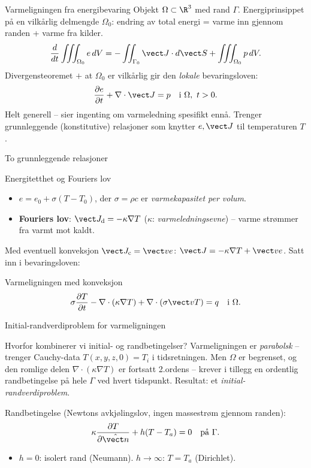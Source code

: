\documentclass[11pt,aspectratio=169]{beamer}
\begin{document}
\begin{frame}{Varmeligningen fra energibevaring}
Objekt $\Omega\subset\R^3$ med rand $\Gamma$. Energiprinsippet på en vilkårlig delmengde $\Omega_0$: endring av total energi = varme inn gjennom randen + varme fra kilder.
\[
\frac{d}{dt}\iiint_{\Omega_0} e\,dV = -\iint_{\Gamma_0}\vect J\cdot d\vect S + \iiint_{\Omega_0} p\,dV.
\]
Divergensteoremet $+$ at $\Omega_0$ er vilkårlig gir den \emph{lokale} bevaringsloven:
\begin{equation}
\frac{\partial e}{\partial t} + \nabla\cdot\vect J = p \quad \text{i } \Omega,\ t>0.
\end{equation}
Helt generell -- sier ingenting om varmeledning spesifikt ennå. Trenger grunnleggende (konstitutive) relasjoner som knytter $e,\vect J$ til temperaturen $T$.
\end{frame}

\begin{frame}{To grunnleggende relasjoner}
\begin{defnb}{Energitetthet og Fouriers lov}
\begin{itemize}
\item $e = e_0+\sigma(T-T_0)$, der $\sigma=\rho c$ er \emph{varmekapasitet per volum}.
\item \textbf{Fouriers lov}: $\vect J_{\text d}=-\kappa\nabla T$ ($\kappa$: \emph{varmeledningsevne}) -- varme strømmer fra varmt mot kaldt.
\end{itemize}
\end{defnb}
Med eventuell konveksjon $\vect J_{\text c}=\vect v e$: $\vect J=-\kappa\nabla T+\vect v e$. Satt inn i bevaringsloven:
\begin{oppsumb}{Varmeligningen med konveksjon}
\[
\sigma\frac{\partial T}{\partial t} - \nabla\cdot(\kappa\nabla T) + \nabla\cdot(\sigma\vect v T) = q \quad \text{i }\Omega.
\]
\end{oppsumb}
\end{frame}

\begin{frame}{Initial-randverdiproblem for varmeligningen}
\begin{remb}{Hvorfor kombinerer vi initial- og randbetingelser?}
Varmeligningen er \emph{parabolsk} -- trenger Cauchy-data $T(x,y,z,0)=T_i$ i tidsretningen. Men $\Omega$ er begrenset, og den romlige delen $\nabla\cdot(\kappa\nabla T)$ er fortsatt 2.ordens -- krever i tillegg en ordentlig randbetingelse på hele $\Gamma$ ved hvert tidspunkt. Resultat: et \emph{initial-randverdiproblem}.
\end{remb}
Randbetingelse (Newtons avkjølingslov, ingen massestrøm gjennom randen):
\begin{equation}
\kappa\frac{\partial T}{\partial\hat{\vect n}} + h(T-T_a) = 0 \quad \text{på }\Gamma.
\end{equation}
\begin{itemize}
\item $h=0$: isolert rand (Neumann). \quad\quad $h\to\infty$: $T=T_a$ (Dirichlet).
\end{itemize}
\end{frame}
\end{document}
